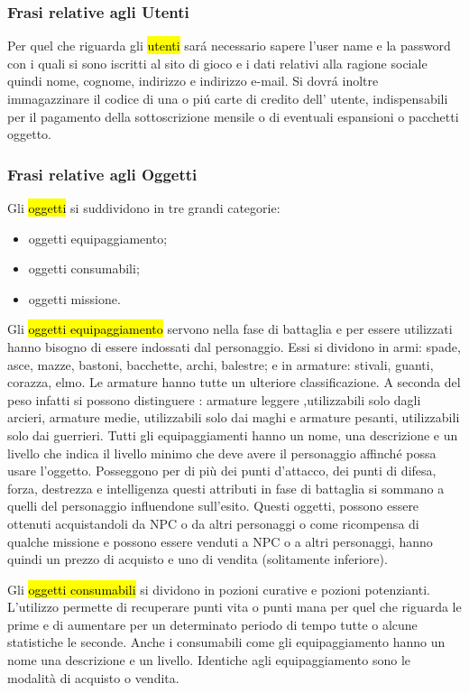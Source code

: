 \subsubsection{Frasi relative agli Utenti}
Per quel che riguarda gli \hl{utenti} sar\'{a} necessario sapere  l'user name e la password con i quali si sono iscritti al sito di gioco e i  dati relativi alla ragione sociale quindi nome, cognome, indirizzo e indirizzo e-mail. Si dovr\'{a} inoltre immagazzinare il codice di una o pi\'{u} carte di credito dell' utente, indispensabili per il  pagamento della sottoscrizione mensile o di eventuali espansioni o pacchetti oggetto.\\

\subsubsection{Frasi relative agli Oggetti}

Gli \hl{oggetti} si suddividono  in tre grandi categorie: 
\begin{itemize}
\item	oggetti equipaggiamento;
\item	oggetti consumabili;
\item	oggetti missione.
\end{itemize}

Gli \hl{oggetti equipaggiamento} servono nella fase di battaglia e per essere utilizzati hanno bisogno di essere indossati dal personaggio. Essi si dividono in armi: spade, asce, mazze, bastoni, bacchette, archi, balestre; e in armature: stivali, guanti, corazza, elmo. Le armature hanno tutte un ulteriore classificazione. A seconda del peso infatti si possono distinguere : armature leggere ,utilizzabili solo dagli arcieri, armature medie, utilizzabili solo dai maghi  e armature pesanti, utilizzabili solo dai guerrieri. Tutti gli equipaggiamenti hanno un nome, una descrizione  e  un livello che indica il livello minimo che deve avere il personaggio affinch\'{e} possa usare l'oggetto. Posseggono per di pi\`{u} dei punti d'attacco, dei punti di difesa, forza, destrezza e intelligenza  questi attributi in fase di battaglia si sommano a quelli del personaggio influendone sull'esito. Questi  oggetti, possono essere ottenuti acquistandoli da NPC o da altri personaggi o come ricompensa di  qualche missione e possono  essere venduti a NPC o a altri personaggi, hanno quindi un prezzo di acquisto e uno di vendita (solitamente inferiore).

Gli \hl{oggetti consumabili} si dividono in pozioni curative e pozioni potenzianti. L'utilizzo permette di recuperare punti vita o punti mana per quel che riguarda le prime e di aumentare per un determinato periodo di tempo tutte o alcune statistiche le seconde. Anche i consumabili come gli equipaggiamento hanno un nome una descrizione e un livello. Identiche agli equipaggiamento sono le modalità di acquisto o vendita.\\

